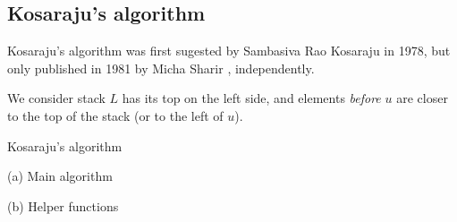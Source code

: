 \subsection{Kosaraju's algorithm} \label{algorithm-scc-kosaraju}
Kosaraju's algorithm was first sugested by Sambasiva Rao Kosaraju in 1978, but only published in 1981 by Micha Sharir \cite{sharir81}, independently.\par
We consider stack $L$ has its top on the left side, and elements \emph{before} $u$ are closer to the top of the stack (or to the left of $u$).
\begin{algorithm}
    \caption{Kosaraju's algorithm}
    \label{alg-kosaraju}
    \begin{minipage}[t]{0.49\textwidth}
        (a) Main algorithm
        \begin{algorithmic}[1]
             {}
            \EndFor
                \State {}
            \EndWhile
            \State {}
            \EndFunction
        \end{algorithmic}
    \end{minipage}
    \begin{minipage}[t]{0.49\textwidth}
        (b) Helper functions
        \begin{algorithmic}[1]
                 {\Return{}}
                \EndIf
                 {}
                \EndFor
            \EndFunction


                 {\Return{}}
                \EndIf
                \For{$v : Adj[u]]$} {}
                \EndFor
            \EndFunction
        \end{algorithmic}
    \end{minipage}
\end{algorithm}
